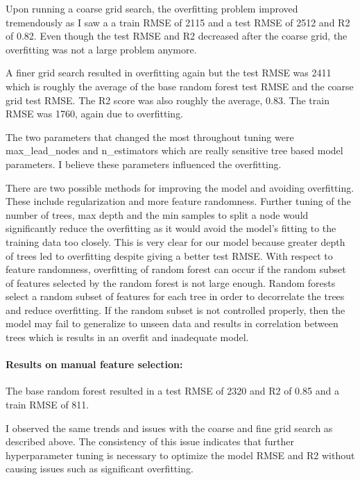 \documentclass[
  letterpaper,
  DIV=11,
  numbers=noendperiod]{scrartcl}
\let\oldparagraph\paragraph
\renewcommand{\paragraph}[1]{\oldparagraph{#1}\mbox{}}
\begin{document}
Upon running a coarse grid search, the overfitting problem improved
tremendously as I saw a a train RMSE of 2115 and a test RMSE of 2512 and
R2 of 0.82. Even though the test RMSE and R2 decreased after the coarse
grid, the overfitting was not a large problem anymore.

A finer grid search resulted in overfitting again but the test RMSE was
2411 which is roughly the average of the base random forest test RMSE
and the coarse grid test RMSE. The R2 score was also roughly the
average, 0.83. The train RMSE was 1760, again due to overfitting.

The two parameters that changed the most throughout tuning were
max\_lead\_nodes and n\_estimators which are really sensitive tree based
model parameters. I believe these parameters influenced the overfitting.

There are two possible methods for improving the model and avoiding
overfitting. These include regularization and more feature randomness.
Further tuning of the number of trees, max depth and the min samples to
split a node would significantly reduce the overfitting as it would
avoid the model's fitting to the training data too closely. This is very
clear for our model because greater depth of trees led to overfitting
despite giving a better test RMSE. With respect to feature randomness,
overfitting of random forest can occur if the random subset of features
selected by the random forest is not large enough. Random forests select
a random subset of features for each tree in order to decorrelate the
trees and reduce overfitting. If the random subset is not controlled
properly, then the model may fail to generalize to unseen data and
results in correlation between trees which is results in an overfit and
inadequate model.

\hypertarget{results-on-manual-feature-selection}{%
\paragraph{Results on manual feature
selection:}\label{results-on-manual-feature-selection}}

The base random forest resulted in a test RMSE of 2320 and R2 of 0.85
and a train RMSE of 811.

I observed the same trends and issues with the coarse and fine grid
search as described above. The consistency of this issue indicates that
further hyperparameter tuning is necessary to optimize the model RMSE
and R2 without causing issues such as significant overfitting.
\end{document}
